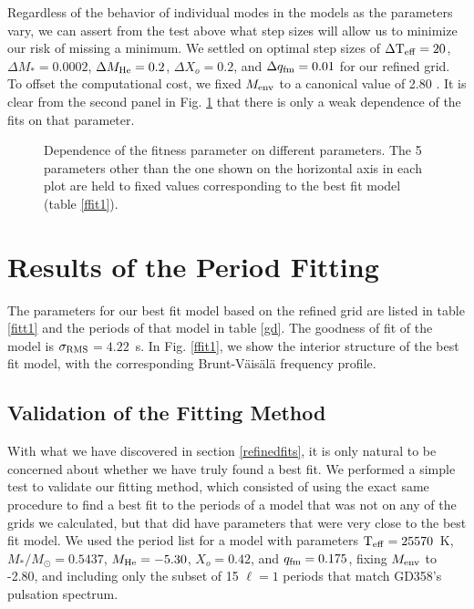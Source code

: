 \documentclass[12pt,preprint]{aastex}
\newcommand{\bvf}{Brunt-V\"ais\"al\"a }
\newcommand{\sigrms}{$\sigma_{\rm RMS}$}
\begin{document}
Regardless of the behavior of individual modes in the models as the parameters vary, 
we can assert from the test above what step sizes will allow us to minimize our risk 
of missing a minimum. We settled on optimal step sizes of 
$\Delta {\rm T_{eff}}=20$, $\Delta M_*=0.0002$, $\Delta M_{\rm He}=0.2$, 
$\Delta X_o=0.2$, and $\Delta q_{\rm fm}=0.01$ for our refined grid. To offset 
the computational cost, we fixed $M_{\rm env}$ to a canonical value of 
2.80 \citep{Dehner95}. It is clear from the second panel in Fig. \ref{ffit4} 
that there is only a weak dependence of the fits on that parameter.
		
\begin{figure}
\caption{
\label{ffit4}
Dependence of the fitness parameter on different parameters. The 5 parameters other than the one shown on the horizontal axis in each plot are held to fixed values corresponding to the best fit model (table \ref{ffit1}).
}


\end{figure}

\section{Results of the Period Fitting}
\label{results}

The parameters for our best fit model based on the refined grid are listed in table \ref{fitt1} and the periods of that model in table \ref{gd}. The goodness of fit of the model is \sigrms$=4.22$~s. In Fig. \ref{ffit1}, we show the interior structure of the best fit model, with the corresponding \bvf frequency profile.

\subsection{Validation of the Fitting Method}

With what we have discovered in section \ref{refinedfits}, it is only natural to be concerned about whether we have truly found a best fit. We performed a simple test to validate our fitting method, which consisted of using the exact same procedure to find a best fit to the periods of a model that was not on any of the grids we calculated, but that did have parameters that were very close to the best fit model. We used the period list for a model with parameters ${\rm T_{eff}}=25570$~K, $M_*/M_\odot=0.5437$, $M_{\rm He}=-5.30$, $X_o=0.42$, and $q_{\rm fm}=0.175$, fixing $M_{\rm env}$ to -2.80, and including only the subset of 15 $\ell=1$ periods that match GD358's pulsation spectrum.
\end{document}
